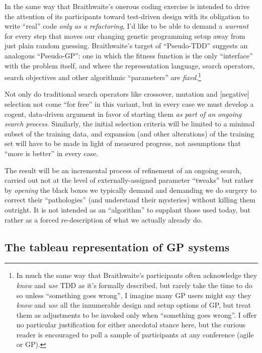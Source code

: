 In the same way that Braithwaite's onerous coding exercise is intended to drive the attention of its participants toward test-driven design with its obligation to write ``real'' code \emph{only as a refactoring}, I'd like to be able to demand a \emph{warrant} for every step that moves our changing genetic programming setup away from just plain random guessing. Braithwaite's target of ``Pseudo-TDD'' suggests an analogous ``Pseudo-GP'': one in which the fitness function is the only ``interface'' with the problem itself, and where the representation language, search operators, search objectives and other algorithmic ``parameters'' are \emph{fixed}.\footnote{In much the same way that Braithwaite's participants often acknowledge they \emph{know} and \emph{use} TDD as it's formally described, but rarely take the time to do so unless ``something goes wrong'', I imagine many GP users might say they \emph{know} and \emph{use} all the innumerable design and setup options of GP, but treat them as adjustments to be invoked only when ``something goes wrong''. I offer no particular justification for either anecdotal stance here, but the curious reader is encouraged to poll a sample of participants at any conference (agile or GP).}

Not only do traditional search operators like crossover, mutation and [negative] selection not come ``for free'' in this variant, but in every case we must develop a cogent, data-driven argument in favor of starting them \emph{as part of an ongoing search process}. Similarly, the initial selection criteria will be limited to a minimal subset of the training data, and expansion (and other alterations) of the training set will have to be made in light of measured progress, not assumptions that ``more is better'' in every case.

The result will be an incremental process of refinement of an ongoing search, carried out not at the level of externally-assigned parameter ``tweaks'' but rather by \emph{opening} the black boxes we typically demand and demanding we do surgery to correct their ``pathologies'' (and understand their mysteries) without killing them outright. It is not intended as an ``algorithm'' to supplant those used today, but rather as a forced re-description of what we actually already do.

\subsection{The tableau representation of GP systems}\hypertarget{the-tableau-representation-of-gp-systems}{}\label{the-tableau-representation-of-gp-systems}

